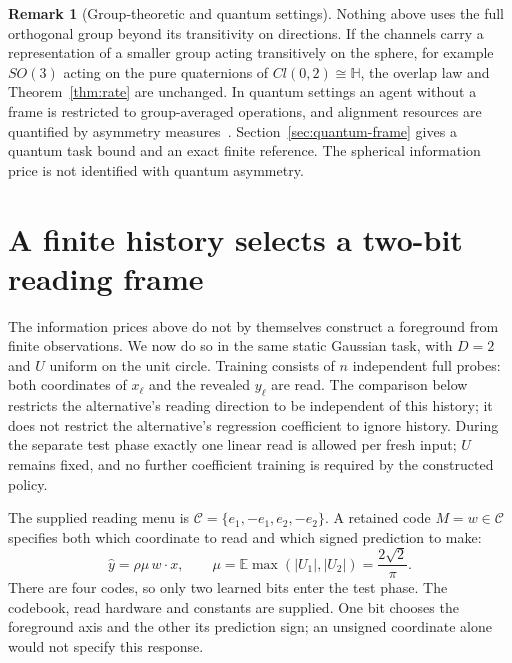 \documentclass[12pt]{article}
\theoremstyle{definition}
\newtheorem{remark}[theorem]{Remark}
\newcommand{\E}{\mathbb E}
\begin{document}
\begin{remark}[Group-theoretic and quantum settings]
\label{rem:clifford}
Nothing above uses the full orthogonal group beyond its transitivity on directions. If the channels carry a representation of a smaller group acting transitively on the sphere, for example $SO(3)$ acting on the pure quaternions of $Cl(0,2)\cong\mathbb H$, the overlap law and Theorem~\ref{thm:rate} are unchanged. In quantum settings an agent without a frame is restricted to group-averaged operations, and alignment resources are quantified by asymmetry measures~\cite{BRS2007,SkotiniotisGour2012}. Section~\ref{sec:quantum-frame} gives a quantum task bound and an exact finite reference. The spherical information price is not identified with quantum asymmetry.
\end{remark}

\section{A finite history selects a two-bit reading frame}
\label{sec:finite-formation}

The information prices above do not by themselves construct a foreground
from finite observations. We now do so in the same static Gaussian
task, with $D=2$ and $U$ uniform on the unit circle.
Training consists of $n$ independent full probes: both coordinates
of $x_\ell$ and the revealed $y_\ell$ are read.
The comparison below restricts the alternative's reading direction to
be independent of this history; it does not restrict the alternative's
regression coefficient to ignore history.
During the separate test phase exactly one linear read is allowed
per fresh input; $U$ remains fixed, and no further coefficient
training is required by the constructed policy.

The supplied reading menu is
$\mathcal C=\{e_1,-e_1,e_2,-e_2\}$.
A retained code $M=w\in\mathcal C$ specifies both which coordinate
to read and which signed prediction to make:
\begin{equation}
 \widehat y=\rho\mu\,w\cdot x,\qquad
 \mu=\E\max(|U_1|,|U_2|)=\frac{2\sqrt2}{\pi}.
 \label{eq:two-bit-predictor}
\end{equation}
There are four codes, so only two learned bits enter the test phase.
The codebook, read hardware and constants are supplied.
One bit chooses the foreground axis and the other its prediction sign;
an unsigned coordinate alone would not specify this response.
\end{document}
